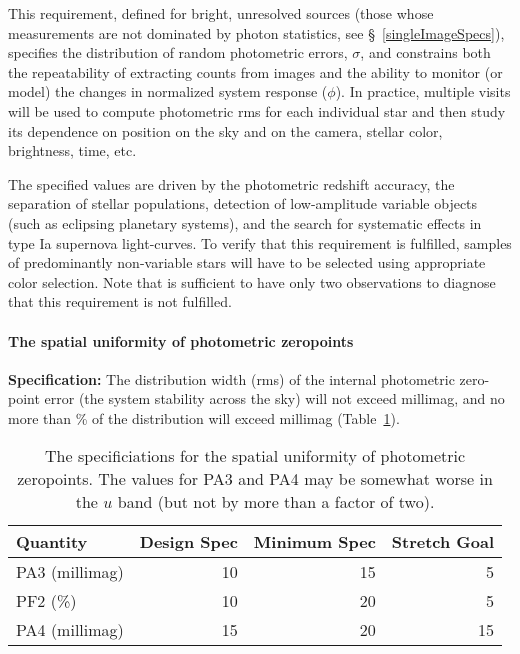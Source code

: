 This requirement, defined for bright, unresolved sources
(\ie those whose measurements are not dominated by photon
statistics, see \S~\ref{singleImageSpecs}),
specifies the distribution of random photometric
errors, $\sigma$, and constrains both the repeatability of extracting
counts from images and the ability to monitor (or model) the
changes in normalized system response ($\phi$). In practice,
multiple visits will be used to compute photometric rms for each
individual star and then study its dependence on position on the sky
and on the camera, stellar color, brightness, time, etc.

The specified values are driven by the photometric redshift accuracy,
the separation of stellar populations, detection of low-amplitude variable
objects (such as eclipsing planetary systems), and the search for
systematic effects in type Ia supernova light-curves. To verify that this
requirement is fulfilled, samples of predominantly non-variable stars will
have to be selected using appropriate color selection. Note that is
sufficient to have only two observations to diagnose that this requirement
is not fulfilled.


\paragraph{The spatial uniformity of photometric zeropoints\\}

{\bf Specification:} The distribution width (rms) of the internal
photometric zero-point error (the system stability across the sky) will
not exceed
millimag, and no more than
\% of the distribution will exceed
 millimag (Table~\ref{TphotomUniform}).

\begin{table}[h]
\begin{tabular}{|l|r|r|r|}
\hline
Quantity   & Design Spec & Minimum Spec & Stretch Goal   \\
\hline
      PA3 (millimag)  &    10     &       15    &        5     \\
      PF2  (\%)       &    10     &       20    &        5     \\
      PA4 (millimag)  &    15     &       20    &       15     \\
\hline
\end{tabular}
\caption{The specificiations for the spatial uniformity of photometric
zeropoints. The values for PA3 and PA4 may be somewhat worse in the
$u$ band (but not by more than a factor of two).}
\label{TphotomUniform}
\end{table}

